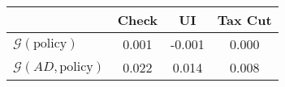 \begin{tabular}{@{}lccc@{}} 
\toprule 
                          & Check      & UI    & Tax Cut    \\  \midrule 
$\mathcal{G}(\text{policy})$ & 0.001  & -0.001  & 0.000     \\ 
$\mathcal{G}(AD,\text{policy})$ & 0.022  & 0.014  & 0.008     \\ 
\end{tabular}  
